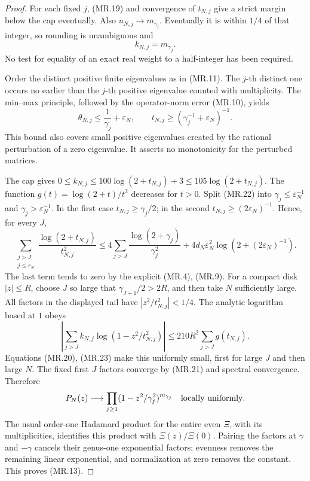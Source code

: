 \begin{proof}
For each fixed \(j\), (MR.19) and convergence of \(t_{N,j}\)
give a strict margin below the cap eventually.  Also
\(u_{N,j}\to m_{\gamma_j}\).  Eventually it is within \(1/4\)
of that integer, so rounding is unambiguous and
\[
                     k_{N,j}=m_{\gamma_j}.
 \tag{MR.21}
\]
No test for equality of an exact real weight to a half-integer
has been required.

Order the distinct positive finite eigenvalues as in (MR.11).
The \(j\)-th distinct one occurs no earlier than the \(j\)-th
positive eigenvalue counted with multiplicity.  The min--max
principle, followed by the operator-norm error (MR.10), yields
\[
 \theta_{N,j}\le\frac1{\gamma_j}+\varepsilon_N,\qquad
 t_{N,j}\ge\left(\gamma_j^{-1}+\varepsilon_N\right)^{-1}.
 \tag{MR.22}
\]
This bound also covers small positive eigenvalues created by
the rational perturbation of a zero eigenvalue.  It asserts no
monotonicity for the perturbed matrices.

The cap gives
\(0\le k_{N,j}\le100\log(2+t_{N,j})+3
 \le105\log(2+t_{N,j})\).
The function \(g(t)=\log(2+t)/t^2\) decreases for \(t>0\).
Split (MR.22) into \(\gamma_j\le\varepsilon_N^{-1}\) and
\(\gamma_j>\varepsilon_N^{-1}\).  In the first case
\(t_{N,j}\ge\gamma_j/2\); in the second
\(t_{N,j}\ge(2\varepsilon_N)^{-1}\).  Hence, for every \(J\),
\[
 \sum_{\substack{j>J\\j\le r_N}}
       \frac{\log(2+t_{N,j})}{t_{N,j}^2}
 \le4\sum_{j>J}\frac{\log(2+\gamma_j)}{\gamma_j^2}
   +4d_N\varepsilon_N^2
                       \log(2+(2\varepsilon_N)^{-1}).
 \tag{MR.23}
\]
The last term tends to zero by the explicit (MR.4), (MR.9).
For a compact disk \(|z|\le R\), choose \(J\) so large that
\(\gamma_{J+1}/2>2R\), and then take \(N\) sufficiently large.
All factors in the displayed tail have \(|z^2/t_{N,j}^2|<1/4\).
The analytic logarithm based at \(1\) obeys
\[
 \left|\sum_{j>J}k_{N,j}
        \log(1-z^2/t_{N,j}^2)\right|
       \le210R^2\sum_{j>J}g(t_{N,j}).
 \tag{MR.24}
\]
Equations (MR.20), (MR.23) make this uniformly small, first for
large \(J\) and then large \(N\).  The fixed first \(J\) factors
converge by (MR.21) and spectral convergence.  Therefore
\[
 P_N(z)\longrightarrow
       \prod_{j\ge1}(1-z^2/\gamma_j^2)^{m_{\gamma_j}}
 \quad\hbox{locally uniformly}.
\]
The usual order-one Hadamard product for the entire even
\(\Xi\), with its multiplicities, identifies this product with
\(\Xi(z)/\Xi(0)\).  Pairing the factors at \(\gamma\) and
\(-\gamma\) cancels their genus-one exponential factors; evenness
removes the remaining linear exponential, and normalization at
zero removes the constant.  This proves (MR.13).


\end{proof}
